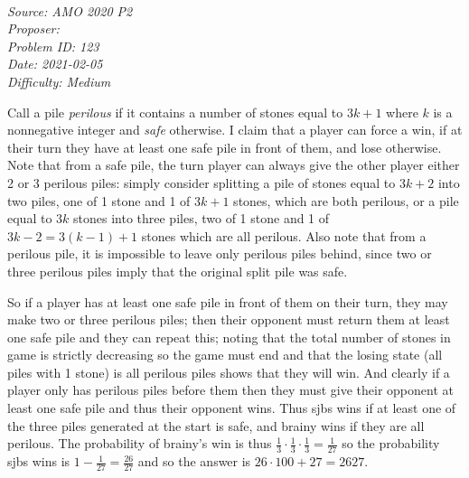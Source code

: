 \SSbreak\\
\emph{Source: AMO 2020 P2}\\
\emph{Proposer: \Pchris}\\ 
\emph{Problem ID: 123}\\
\emph{Date: 2021-02-05}\\
\emph{Difficulty: Medium}\\
\SSbreak

\bigskip

\begin{solution}\hfil\medskip

Call a pile \textit{perilous} if it contains a number of stones equal to $3k + 1$ where $k$ is a nonnegative integer and \textit{safe} otherwise. I claim that a player can force a win, if at their turn they have at least one safe pile in front of them, and lose otherwise. 
Note that from a safe pile, the turn player can always give the other player either 2 or 3 perilous piles: simply consider splitting a pile of stones equal to $3k + 2$ into two piles, one of 1 stone and 1 of $3k + 1$ stones, which are both perilous, or a pile equal to $3k$ stones into three piles, two of 1 stone and 1 of $3k - 2 = 3(k - 1) + 1$ stones which are all perilous. Also note that from a perilous pile, it is impossible to leave only perilous piles behind, since two or three perilous piles imply that the original split pile was safe. \medskip

So if a player has at least one safe pile in front of them on their turn, they may make two or three perilous piles; then their opponent must return them at least one safe pile and they can repeat this; noting that the total number of stones in game is strictly decreasing so the game must end and that the losing state (all piles with 1 stone) is all perilous piles shows that they will win. And clearly if a player only has perilous piles before them then they must give their opponent at least one safe pile and thus their opponent wins. 
Thus sjbs wins if at least one of the three piles generated at the start is safe, and brainy wins if they are all perilous. The probability of brainy's win is thus $\frac{1}{3} \cdot \frac{1}{3} \cdot \frac{1}{3} = \frac{1}{27}$ so the probability sjbs wins is $1 - \frac{1}{27} = \frac{26}{27}$ and so the answer is $26 \cdot 100 + 27 = \boxed{2627}$.
\end{solution}\bigskip
